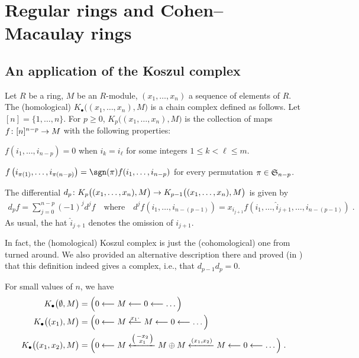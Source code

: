 \documentclass[a4paper,parskip=half,numbers=enddot, DIV=12]{scrreprt}
\renewcommand{\geq}{\geqslant}
\renewcommand{\leq}{\leqslant}
\begin{document}
\chapter{Regular rings and Cohen--Macaulay rings}
\section{An application of the Koszul complex}
\begin{defi}
	Let $R$ be a ring, $M$ be an $R$-module, $(x_1,\ldots,x_n)$ a sequence of elements of $R$. The (homological)  $K_\bullet\big((x_1,\ldots,x_n),M\big)$ is a chain complex defined as follows. Let $[n]=\{1,\ldots,n\}$. For $p\geq0$, $K_p\big((x_1,\ldots,x_n),M\big)$ is the collection of maps $f\colon [n]^{n-p}\morphism M$ with the following properties:
	\begin{alphanumerate}
		\item $f(i_1,\ldots,i_{n-p})=0$ when $i_k=i_\ell$ for some integers $1\leq k<\ell\leq m$.
		\item $f\left(i_{\pi(1)},\ldots,i_{\pi(n-p)}\right)=\sgn(\pi)f(i_1,\ldots,i_{n-p})$ for every permutation $\pi\in\mathfrak{S}_{n-p}$.
	\end{alphanumerate}
	The differential $d_p\colon K_p\big((x_1,\ldots,x_n),M\big)\morphism K_{p-1}\big((x_1,\ldots,x_n),M\big)$ is given by 
	\begin{align*}
	d_pf=\sum_{j=0}^{n-p}(-1)^jd^jf\quad\text{where}\quad d^ jf\left(i_1,\ldots,i_{n-(p-1)}\right)=x_{i_{j+1}}f\left(i_1,\ldots,\hat{i}_{j+1},\ldots,i_{n-(p-1)}\right)\;.
	\end{align*}
	As usual, the hat $\hat{i}_{j+1}$ denotes the omission of $i_{j+1}$.
\end{defi}
In fact, the (homological) Koszul complex is just the (cohomological) one from \cite[Definition~2.1.3]{alggeo2} turned around. We also provided an alternative description there and proved (in \cite[Remark~2.1.1]{alggeo2}) that this definition indeed gives a complex, i.e., that $d_{p-1}d_p=0$.

\begin{example}
	For small values of $n$, we have
	\begin{align*}
	K_\bullet\big(\emptyset,M\big)&=\Big(0\lmorphism M\lmorphism 0\lmorphism\ldots\Big)\\
	K_\bullet\big((x_1),M\big)&=\Big(0\lmorphism M\lmorphism[x_1\cdot] M\lmorphism 0\lmorphism\ldots\Big)\\
	K_\bullet\big((x_1,x_2),M\big)&=\Big(0\lmorphism M\xleftarrow{\left(\begin{smallmatrix}
		-x_2\\
		x_1
		\end{smallmatrix}\right)} M\oplus M\xleftarrow{(x_1,x_2)} M\lmorphism 0\lmorphism\ldots\Big)\;.
	\end{align*}
\end{example}
\end{document}
